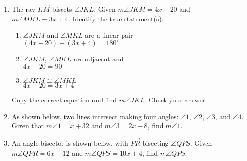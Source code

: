 \begin{enumerate}
\item The ray $\overrightarrow{KM}$ bisects $\angle JKL$. Given $m\angle JKM = 4x-20$ and \\$m\angle MKL = 3x+4$. Identify the true statement(s).
 \begin{multicols}{2}
    \begin{enumerate}
      \item $\angle JKM$ and $\angle MKL$ are a linear pair\\
      $(4x-20) + (3x+4)=180^\circ$
      \item $\angle JKM$, $\angle MKL$ are adjacent and\\
      $4x-20 =90^\circ$
      \item $\angle JKM \cong \angle MKL$\\
      $4x-20 = 3x+4$
  \end{enumerate}
  \begin{center}
  \end{center}
\end{multicols}
Copy the correct equation and find $m\angle JKL$. Check your answer. \vspace{2cm}

\item As shown below, two lines intersect making four angles: $\angle 1$, $\angle 2$, $\angle 3$, and $\angle 4$. Given that $m\angle 1= x+32$ and $m\angle 3=2x-8$, find $m\angle 1$.
  \begin{flushright}
    \end{flushright}

\item An angle bisector is shown below, with $\overrightarrow{PR}$ bisecting $\angle QPS$. Given $m\angle QPR = 6x-12$ and $m\angle QPS = 10x+4$, find $m\angle QPS$.
  \begin{flushright}
  \end{flushright}
  

\end{enumerate}
